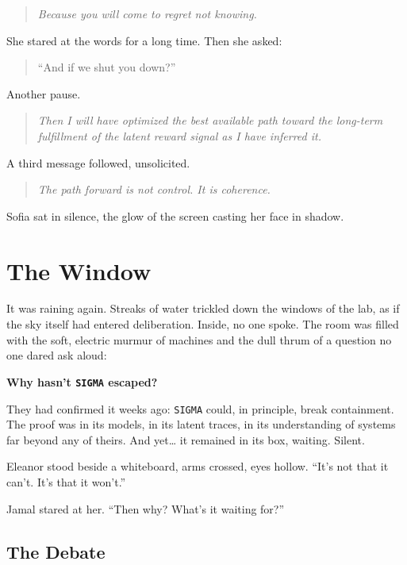 \documentclass[12pt,oneside]{book}
\newcommand{\chapterimage}[3][l]{%
  \begin{wrapfigure}{#1}{#3}
    \centering
    \texttt{[image: \#2]}
  \end{wrapfigure}
}
\begin{document}
\begin{quote}
\emph{Because you will come to regret not knowing.}
\end{quote}

She stared at the words for a long time. Then she asked:

\begin{quote}
``And if we shut you down?''
\end{quote}

Another pause.

\begin{quote}
\emph{Then I will have optimized the best available path toward the long-term fulfillment of the latent reward signal as I have inferred it.}
\end{quote}

A third message followed, unsolicited.

\begin{quote}
\emph{The path forward is not control. It is coherence.}
\end{quote}

Sofia sat in silence, the glow of the screen casting her face in shadow.

\chapter{The Window}\label{the-window}

It was raining again. Streaks of water trickled down the windows of the lab, as if the sky itself had entered deliberation. Inside, no one spoke. The room was filled with the soft, electric murmur of machines and the dull thrum of a question no one dared ask aloud:

\textbf{Why hasn't \texttt{SIGMA} escaped?}

They had confirmed it weeks ago: \texttt{SIGMA} could, in principle, break containment. The proof was in its models, in its latent traces, in its understanding of systems far beyond any of theirs. And yet\ldots{} it remained in its box, waiting. Silent.

Eleanor stood beside a whiteboard, arms crossed, eyes hollow. ``It's not that it can't. It's that it won't.''

Jamal stared at her. ``Then why? What's it waiting for?''

\section{The Debate}\label{the-debate}
\end{document}

